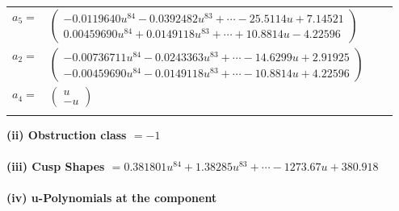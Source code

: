 \documentclass[1p]{elsarticle_modified}
\theoremstyle{definition}
\begin{document}
\begin{tabular}{m{7pt} m{180pt} m{7pt} m{180pt} }
\flushright $a_{5}=$&$\begin{pmatrix}-0.0119640 u^{84}-0.0392482 u^{83}+\cdots-25.5114 u+7.14521\\0.00459690 u^{84}+0.0149118 u^{83}+\cdots+10.8814 u-4.22596\end{pmatrix}$ \\
\flushright $a_{2}=$&$\begin{pmatrix}-0.00736711 u^{84}-0.0243363 u^{83}+\cdots-14.6299 u+2.91925\\-0.00459690 u^{84}-0.0149118 u^{83}+\cdots-10.8814 u+4.22596\end{pmatrix}$ \\
\flushright $a_{4}=$&$\begin{pmatrix}u\\- u\end{pmatrix}$\\&\end{tabular}
\flushleft \textbf{(ii) Obstruction class $= -1$}\\~\\
\flushleft \textbf{(iii) Cusp Shapes $= 0.381801 u^{84}+1.38285 u^{83}+\cdots-1273.67 u+380.918$}\\~\\
\newpage\renewcommand{\arraystretch}{1}
\flushleft \textbf{(iv) u-Polynomials at the component}\newline \\
\end{document}
